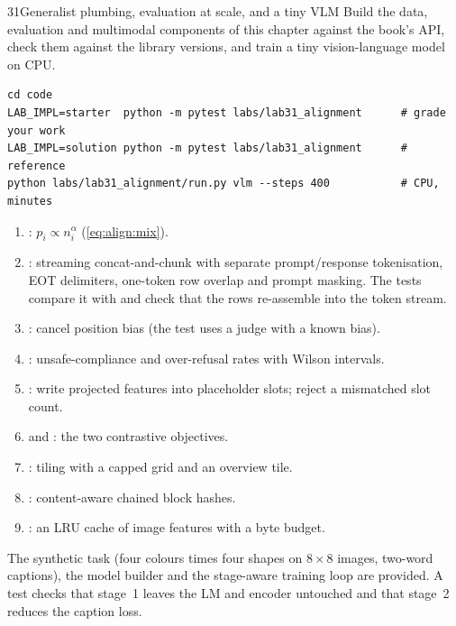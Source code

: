 \begin{labbox}{31}{Generalist plumbing, evaluation at scale, and a tiny VLM}
Build the data, evaluation and multimodal components of this chapter against the book's
 API, check them against the library versions, and train a tiny vision-language model
on CPU.

\begin{lstlisting}[style=shell]
cd code
LAB_IMPL=starter  python -m pytest labs/lab31_alignment      # grade your work
LAB_IMPL=solution python -m pytest labs/lab31_alignment      # reference
python labs/lab31_alignment/run.py vlm --steps 400           # CPU, minutes
\end{lstlisting}

\begin{enumerate}
  \item {}: $p_i\propto n_i^\alpha$ (\cref{eq:align:mix}).
  \item {}: streaming concat-and-chunk with separate prompt/response tokenisation,
        EOT delimiters, one-token row overlap and prompt masking. The tests compare it with
         and check that the rows re-assemble into the token stream.
  \item {}: cancel position bias (the test uses a judge with a known bias).
  \item {}: unsafe-compliance and over-refusal rates with Wilson intervals.
  \item {}: write projected features into placeholder slots; reject a
        mismatched slot count.
  \item {} and : the two contrastive objectives.
  \item {}: tiling with a capped grid and an overview tile.
  \item {}: content-aware chained block hashes.
  \item {}: an LRU cache of image features with a byte budget.
\end{enumerate}
The synthetic task (four colours times four shapes on $8\times8$ images, two-word captions), the model
builder and the stage-aware training loop are provided. A test checks that stage~1 leaves the LM and
encoder untouched and that stage~2 reduces the caption loss.


\end{labbox}
